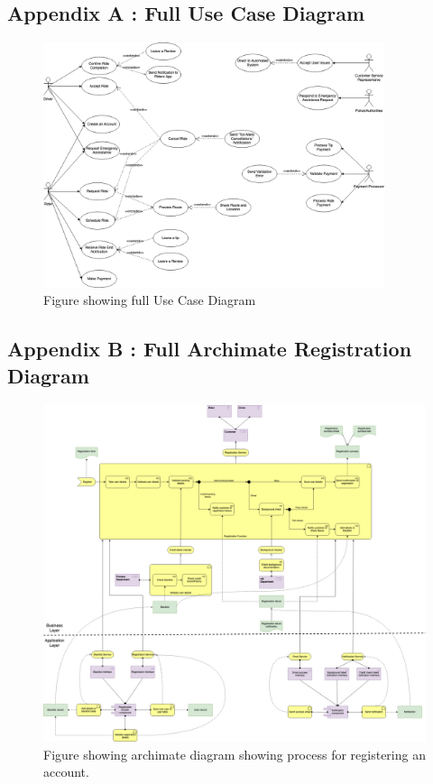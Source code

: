 \documentclass{article}
\begin{document}
    \subsection{Appendix A : Full Use Case Diagram}
      \begin{figure}[H]
        \centering
        \includegraphics[width=10cm]{assets/use_cases.drawio.png}
        \caption{Figure showing full Use Case Diagram}
        \label{fig:fullUseCase}
      \end{figure}
    
    \newpage
    \subsection{Appendix B : Full Archimate Registration Diagram}
    \label{sec:AppendixB}
      \begin{figure}[H]
        \centering
        \captionsetup{justification=centering}
        \includegraphics[width=12cm]{assets/arch_full.drawio.png}
        \caption{Figure showing archimate diagram showing process for registering an account.}
        \label{fig:archimateProcessFull}
      \end{figure}
\end{document}
